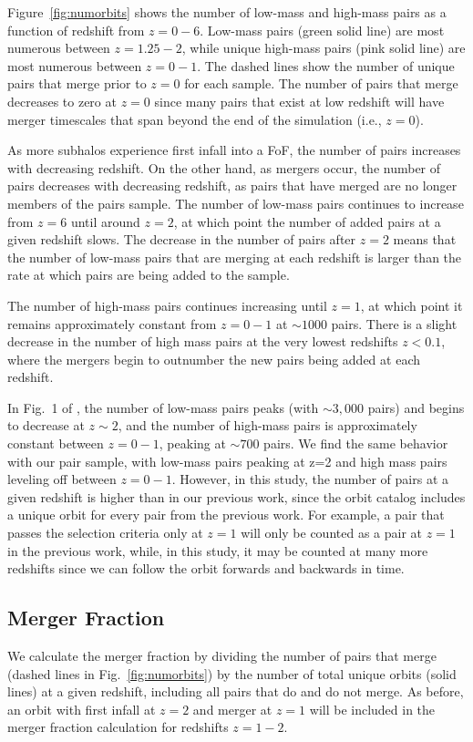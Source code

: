 \documentclass[twocolumn,linenumbers]{aastex631}
\newcommand{\chambe}{\citet{Chamberlain2024}}
\begin{document}
Figure~\ref{fig:numorbits} shows the number of low-mass and high-mass pairs as a function of redshift from $z=0-6$. 
Low-mass pairs (green solid line) are most numerous between $z=1.25-2$, while unique high-mass pairs (pink solid line) are most numerous between $z=0-1$.
The dashed lines show the number of unique pairs that merge prior to $z=0$ for each sample. 
The number of pairs that merge decreases to zero at $z=0$ since many pairs that exist at low redshift will have merger timescales that span beyond the end of the simulation (i.e., $z=0$). 

As more subhalos experience first infall into a FoF, the number of pairs increases with decreasing redshift. 
On the other hand, as mergers occur, the number of pairs decreases with decreasing redshift, as pairs that have merged are no longer members of the pairs sample.
The number of low-mass pairs continues to increase from $z=6$ until around $z=2$, at which point the number of added pairs at a given redshift slows. 
The decrease in the number of pairs after $z=2$ means that the number of low-mass pairs that are merging at each redshift is larger than the rate at which pairs are being added to the sample.

The number of high-mass pairs continues increasing until $z=1$, at which point it remains approximately constant from $z=0-1$ at $\sim1000$ pairs. 
There is a slight decrease in the number of high mass pairs at the very lowest redshifts $z<0.1$, where the mergers begin to outnumber the new pairs being added at each redshift.

In Fig.~1 of \chambe{}, the number of low-mass pairs peaks (with $\sim3,000$ pairs) and begins to decrease at $z\sim2$, and the number of high-mass pairs is approximately constant between $z=0-1$, peaking at $\sim700$ pairs. 
We find the same behavior with our pair sample, with low-mass pairs peaking at z=2 and high mass pairs leveling off between $z=0-1$. 
However, in this study, the number of pairs at a given redshift is higher than in our previous work, since the orbit catalog includes a unique orbit for every pair from the previous work.
For example, a pair that passes the \chambe{} selection criteria only at $z=1$ will only be counted as a pair at $z=1$ in the previous work, while, in this study, it may be counted at many more redshifts since we can follow the orbit forwards and backwards in time. 


\subsection{Merger Fraction}
We calculate the merger fraction by dividing the number of pairs that merge (dashed lines in Fig.~\ref{fig:numorbits}) by the number of total unique orbits (solid lines) at a given redshift, including all pairs that do and do not merge. 
As before, an orbit with first infall at $z=2$ and merger at $z=1$ will be included in the merger fraction calculation for redshifts $z=1-2$.
\end{document}
